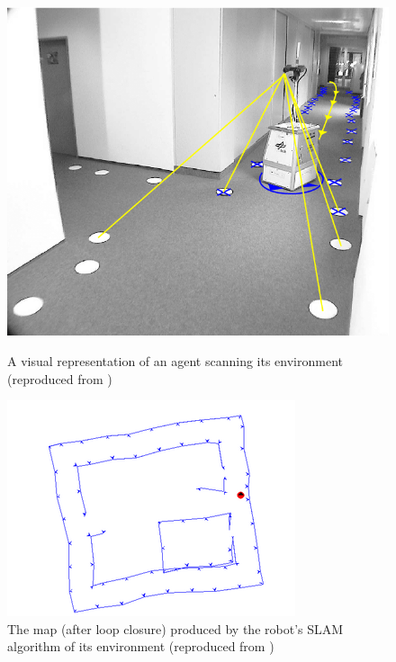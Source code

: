 \documentclass[12pt]{article}
\begin{document}
\begin{figure}[h]
    \centering
    \begin{minipage}{0.45\textwidth}
        \centering
        \includegraphics[width=\linewidth]{SLAM_agent} %
        \caption[Short caption]{A visual representation of an agent scanning its environment (reproduced from \cite{SLAM_overview})}
        \label{fig:SLAM_agent}
    \end{minipage}\hfill
    \begin{minipage}{0.45\textwidth}
        \centering
        \includegraphics[width=\linewidth]{SLAM_map} %
        \caption[Short caption]{The map (after loop closure) produced by the robot's SLAM algorithm of its environment (reproduced from \cite{SLAM_overview})}
        \label{fig:SLAM_map}
    \end{minipage}
\end{figure}
\end{document}
